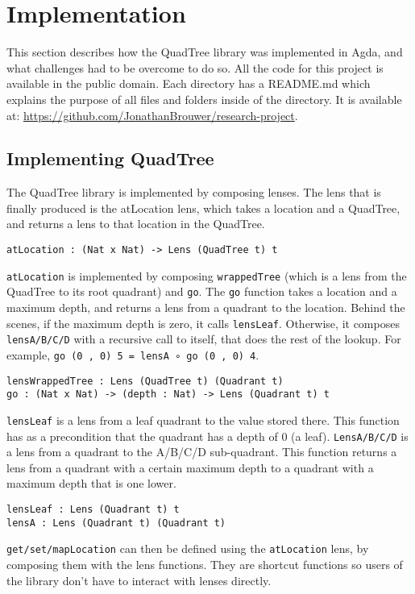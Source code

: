 \section{Implementation} \label{implementation}
This section describes how the QuadTree library was implemented in Agda, and what challenges had to be overcome to do so. All the code for this project is available in the public domain. Each directory has a README.md which explains the purpose of all files and folders inside of the directory.
It is available at: \textcolor{blue}{\href{https://github.com/JonathanBrouwer/research-project}{https://github.com/JonathanBrouwer/research-project}}. 

\subsection{Implementing QuadTree}
The QuadTree library is implemented by composing lenses. The lens that is finally produced is the atLocation lens, which takes a location and a QuadTree, and returns a lens to that location in the QuadTree.
\begin{verbatim}
atLocation : (Nat x Nat) -> Lens (QuadTree t) t
\end{verbatim}
 \verb|atLocation| is implemented by composing \verb|wrappedTree| (which is a lens from the QuadTree to its root quadrant) and  \verb|go|.   The \verb|go| function takes a location and a maximum depth, and returns a lens from a quadrant to the location. Behind the scenes, if the maximum depth is zero, it calls  \verb|lensLeaf|. Otherwise, it composes  \verb|lensA/B/C/D| with a recursive call to itself, that does the rest of the lookup. For example, \verb|go (0 , 0) 5 = lensA ∘ go (0 , 0) 4|.
\begin{verbatim}
lensWrappedTree : Lens (QuadTree t) (Quadrant t)
go : (Nat x Nat) -> (depth : Nat) -> Lens (Quadrant t) t
\end{verbatim}
 \verb|lensLeaf| is a lens from a leaf quadrant to the value stored there. This function has as a precondition that the quadrant has a depth of 0 (a leaf).  \verb|LensA/B/C/D| is a lens from a quadrant to the A/B/C/D sub-quadrant. This function returns a lens from a quadrant with a certain maximum depth to a quadrant with a maximum depth that is one lower. 
\begin{verbatim}
lensLeaf : Lens (Quadrant t) t
lensA : Lens (Quadrant t) (Quadrant t)
\end{verbatim}
 \verb|get/set/mapLocation| can then be defined using the  \verb|atLocation| lens, by composing them with the lens functions. They are shortcut functions so users of the library don't have to interact with lenses directly.
